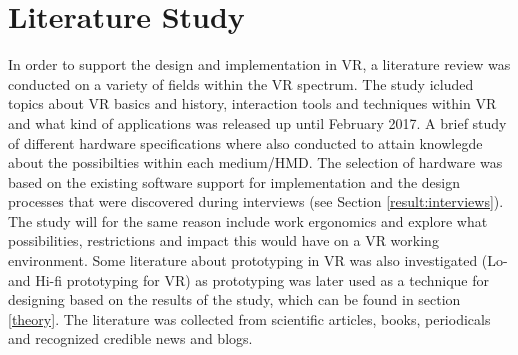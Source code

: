 \section{Literature Study}
In order to support the design and implementation in VR, a literature review was conducted on a variety of fields within the VR spectrum. The study icluded topics about VR basics and history, interaction tools and techniques within VR and what kind of applications was released up until February 2017. A brief study of different hardware specifications where also conducted to attain knowlegde about the possibilties within each medium/HMD. The selection of hardware was based on the existing software support for implementation and the design processes that were discovered during interviews (see Section \ref{result:interviews}). The study will for the same reason include work ergonomics and explore what possibilities, restrictions and impact this would have on a VR working environment. Some literature about prototyping in VR was also investigated (Lo- and Hi-fi prototyping for VR) as prototyping was later used as a technique for designing based on the results of the study, which can be found in section \ref{theory}. The literature was collected from scientific articles, books, periodicals and recognized credible news and blogs.
